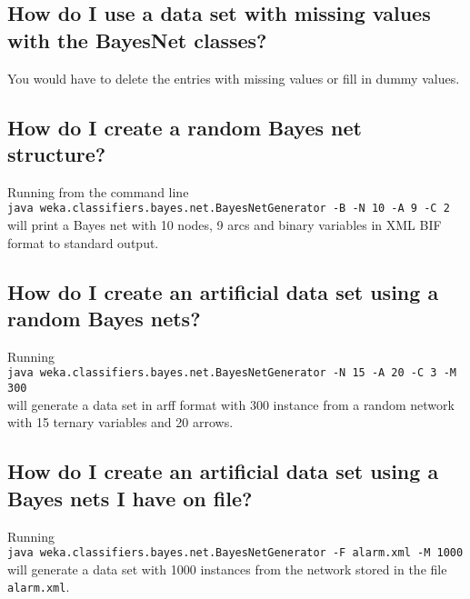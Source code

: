 \subsection*{How do I use a data set with missing values with the BayesNet classes?}
You would have to delete the entries with missing values or
fill in dummy values.

\subsection*{How do I create a random Bayes net structure?}

Running from the command line \\
{\tt java  weka.classifiers.bayes.net.BayesNetGenerator -B -N 10 -A 9 -C 2}\\
will print a Bayes net with 10 nodes, 9 arcs and binary variables
in XML BIF format to standard output.

\subsection*{How do I create an artificial data set using a random Bayes nets?}
Running\\
{\tt java  weka.classifiers.bayes.net.BayesNetGenerator -N 15 -A 20 -C 3 -M 300}\\
will generate a data set in arff format with 300 instance from a random
network with 15 ternary variables and 20 arrows.

\subsection*{How do I create an artificial data set using a Bayes nets I have on file?}
Running\\
{\tt java  weka.classifiers.bayes.net.BayesNetGenerator -F alarm.xml -M 1000}\\
will generate a data set with 1000 instances from the network stored in the file
{\tt alarm.xml}.

